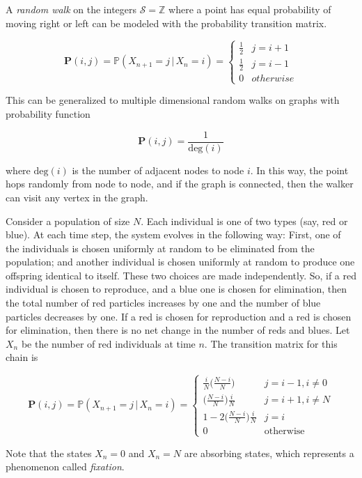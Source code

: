 	\begin{example}
		\label{ex:random-walks}
		A \textit{random walk} on the integers $\mathcal{S} = \mathbb{Z}$ where a point has equal probability of moving right or left can be modeled with the probability transition matrix. 

			\begin{equation}
				\mathbf{P}(i, j) = \mathbb{P}(X_{n+1} = j \, | \, X_n = i) = \begin{cases}
							\frac{1}{2} & j = i + 1 \\
							\frac{1}{2} & j = i - 1\\
							0 & otherwise
							\end{cases}
			\end{equation}

		This can be generalized to multiple dimensional random walks on graphs with probability function 

			\begin{equation}
				\mathbf{P}(i, j) = \frac{1}{\text{deg}(i)}
			\end{equation}

		where $\mathrm{deg}(i)$ is the number of adjacent nodes to node $i$. In this way, the point hops randomly from node to node, and if the graph is connected, then the walker can visit any vertex in the graph. 
	\end{example}

	\begin{example}
		\label{ex:discrete-moran-model}
		Consider a population of size $N$. Each individual is one of two types (say, red or blue). At each time step, the system evolves in the following way: First, one of the individuals is chosen uniformly at random to be eliminated from the population; and another individual is chosen uniformly at random to produce one offspring identical to itself. These two choices are made independently. So, if a red individual is chosen to reproduce, and a blue one is chosen for elimination, then the total number of red particles increases by one and the number of blue particles decreases by one. If a red is chosen for reproduction and a red is chosen for elimination, then there is no net change in the number of reds and blues. Let $X_n$ be the number of red individuals at time $n$. The transition matrix for this chain is

			\begin{equation}
				\mathbf{P}(i, j) = \mathbb{P}(X_{n+1} = j \, | \, X_n = i) = \begin{cases}
							\frac{i}{N} \bigg(\frac{N-i}{N} \bigg) & j=i-1, i \neq 0 \\
							\bigg(\frac{N-i}{N} \bigg) \frac{i}{N} & j=i+1, i \neq N \\
							1 - 2 \bigg(\frac{N-i}{N} \bigg) \frac{i}{N} & j = i \\
							0 & \text{otherwise}
							\end{cases}
			\end{equation}

		Note that the states $X_n = 0$ and $X_n = N$ are absorbing states, which represents a phenomenon called \textit{fixation}. 
	\end{example}

